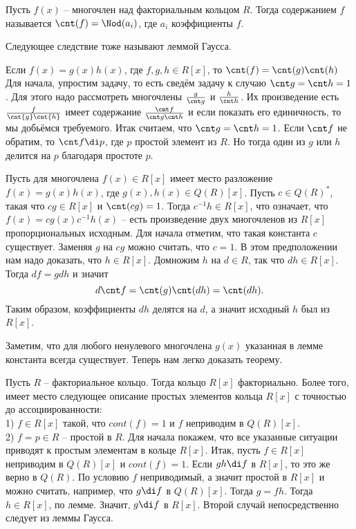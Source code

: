 \dfn Пусть $f(x)$ -- многочлен над факториальным кольцом $R$. Тогда содержанием $f$ называется $\cnt(f)=\Nod (a_i)$, где $a_i$ коэффициенты $f$. 
\edfn

Следующее следствие тоже называют леммой Гаусса.

\crl Если $f(x)=g(x)h(x)$, где $f,g,h \in R[x]$, то $\cnt(f)=\cnt(g)\cnt(h)$
\proof Для начала, упростим задачу, то есть сведём задачу к случаю $\cnt g= \cnt h =1$. Для этого надо рассмотреть многочлены $\frac{g}{\cnt g}$ и $\frac{h}{\cnt h}$. Их произведение есть $\frac{f}{\cnt{g}\cnt{h}}$ имеет содержание $\frac{\cnt f}{\cnt g \cnt h}$ и если показать его единичность, то мы добьёмся требуемого. Итак считаем, что $\cnt g= \cnt h=1$. Если $\cnt f$ не обратим, то $\cnt f \di p$, где $p$ простой элемент из $R$. Но тогда один из $g$ или $h$ делится на $p$ благодаря простоте $p$. 
\endproof
\ecrl


\lm Пусть для многочлена $f(x) \in R[x]$  имеет место разложение $f(x)=g(x)h(x)$, где  $g(x), h(x) \in Q(R)[x]$. Пусть $c \in Q(R)^*$, такая что $cg \in R[x]$ и $\cnt(cg)=1$. Тогда $c^{-1}h \in R[x]$, что означает, что $f(x)=cg(x)c^{-1}h(x)$ -- есть произведение двух многочленов из $R[x]$ пропорциональных исходным.
\proof Для начала отметим, что такая константа $c$ существует. Заменяя $g$ на $cg$ можно считать, что $c=1$. В этом предположении нам надо доказать, что $h\in R[x]$.
Домножим $h$ на $d\in R$, так что $dh \in R[x]$. Тогда $df=g dh$ и значит
$$d\cnt f = \cnt(g) \cnt(dh)=\cnt(dh).$$
Таким образом, коэффициенты $dh$ делятся на $d$, а значит исходный $h$ был из $R[x]$.
\endproof
\elm

Заметим, что для любого ненулевого многочлена $g(x)$ указанная в лемме константа всегда существует. Теперь нам легко доказать теорему.


\thrm Пусть $R$ -- факториальное кольцо. Тогда кольцо $R[x]$ факториально. Более того, имеет место следующее описание простых элементов кольца $R[x]$ с точностью до ассоциированности:\\
1) $f\in R[x]$ такой, что $cont(f)=1$ и $f$ неприводим в $Q(R)[x]$.\\
2) $f=p \in R$ -- простой в $R$.
\proof 
Для начала покажем, что все указанные ситуации приводят к простым элементам в кольце $R[x]$.
Итак, пусть $f \in R[x]$ неприводим в $Q(R)[x]$ и $cont(f)=1$. Если $gh\di f$ в $R[x]$, то это же верно в $Q(R)$. По условию $f$ неприводимый, а значит простой в $R[x]$ и можно считать, например, что $g\di f$ в $Q(R)[x]$. Тогда $g= fh$. Тогда $h\in R[x]$, по лемме. Значит, $g \di f$ в $R[x]$. Второй случай непосредственно следует из леммы Гаусса.


